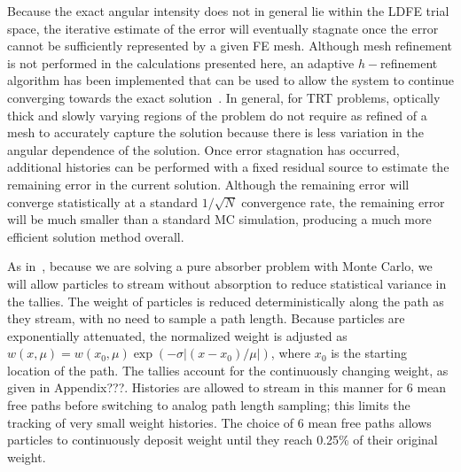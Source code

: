 \documentclass{mc2013}
\begin{document}
Because the exact angular intensity does not in general lie within the LDFE trial space, the
iterative estimate of the error will eventually stagnate once the error cannot be sufficiently
represented by a given FE mesh.  Although mesh refinement is not performed in the
calculations presented here, an adaptive $h-$refinement algorithm has been
implemented that can be used to allow the system to continue converging towards the
exact solution~\cite{jake,ans_2014}. In general, for TRT problems, optically thick and slowly varying
regions of the problem do not require as refined of a mesh to accurately capture the
solution because there is less variation in the angular dependence of the solution.
Once error stagnation has occurred, additional histories can be performed with a
fixed residual source to estimate the remaining error in the current solution.  Although the remaining error will
converge statistically at a standard $1/\sqrt{N}$ convergence rate, the remaining
error will be much smaller than a standard MC simulation, producing a much more
efficient solution method overall.



As in~\cite{park}, because we are solving a pure absorber problem with Monte Carlo, we will allow
particles to stream without absorption to reduce statistical 
variance in the tallies.  The weight of particles is reduced deterministically along
the path as they stream, with no need to sample a path length.  Because particles are exponentially attenuated, the normalized weight is
adjusted as $w(x,\mu) = w(x_0,\mu)\exp(-\sigma|(x-x_0)/\mu|)$, where $x_0$ is the starting location of the path.  The tallies account
for the continuously changing weight, as given in Appendix???. Histories are allowed to stream in this manner for 6 mean free paths
before switching to analog path length sampling; this limits the tracking of very small weight histories. The choice of 6 mean free paths allows particles to 
continuously deposit weight until they reach 0.25\% of their original weight.
\end{document}
